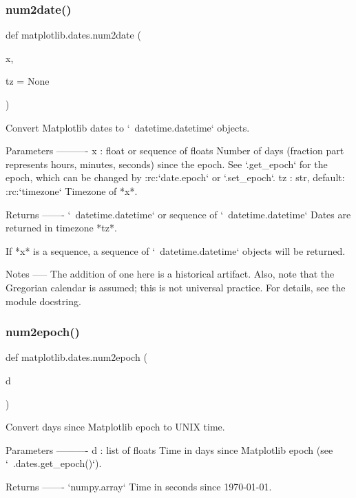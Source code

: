 \subsubsection{\texorpdfstring{num2date()}{num2date()}}
{\footnotesize\ttfamily def matplotlib.\+dates.\+num2date (\begin{DoxyParamCaption}\item[{}]{x,  }\item[{}]{tz = {\ttfamily None} }\end{DoxyParamCaption})}

\begin{DoxyVerb}Convert Matplotlib dates to `~datetime.datetime` objects.

Parameters
----------
x : float or sequence of floats
    Number of days (fraction part represents hours, minutes, seconds)
    since the epoch.  See `.get_epoch` for the
    epoch, which can be changed by :rc:`date.epoch` or `.set_epoch`.
tz : str, default: :rc:`timezone`
    Timezone of *x*.

Returns
-------
`~datetime.datetime` or sequence of `~datetime.datetime`
    Dates are returned in timezone *tz*.

    If *x* is a sequence, a sequence of `~datetime.datetime` objects will
    be returned.

Notes
-----
The addition of one here is a historical artifact. Also, note that the
Gregorian calendar is assumed; this is not universal practice.
For details, see the module docstring.
\end{DoxyVerb}
 \mbox{\label{namespacematplotlib_1_1dates_a49fa1e84c38e615141b843afbf3b2810}} 
\subsubsection{\texorpdfstring{num2epoch()}{num2epoch()}}
{\footnotesize\ttfamily def matplotlib.\+dates.\+num2epoch (\begin{DoxyParamCaption}\item[{}]{d }\end{DoxyParamCaption})}

\begin{DoxyVerb}Convert days since Matplotlib epoch to UNIX time.

Parameters
----------
d : list of floats
    Time in days since Matplotlib epoch (see `~.dates.get_epoch()`).

Returns
-------
`numpy.array`
    Time in seconds since 1970-01-01.
\end{DoxyVerb}
 \mbox{\label{namespacematplotlib_1_1dates_af0b43cb1db9b87a4dcd605e71938bc49}} 
